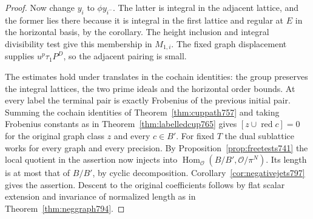 \documentclass[a4paper,11pt]{article}
\theoremstyle{definition}
\theoremstyle{remark}
\numberwithin{equation}{section}
\begin{document}
\begin{proof}
Now change \(y_i\) to \(\phi y_{i^-}\). The latter is
integral in the adjacent lattice, and the former lies
there because it is integral in the first lattice and
regular at \(E\) in the horizontal basis, by the
corollary. The height inclusion and integral divisibility
test give this membership in \(M_{1,i}\). The fixed graph
displacement supplies \(u^p\tau_1P^D\), so the adjacent
pairing is small.

The estimates hold under translates in the cochain identities:
the group preserves the integral lattices, the two prime
ideals and the horizontal order bounds. At every label
the terminal pair is exactly Frobenius of the previous
initial pair. Summing the cochain identities of
Theorem~\ref{thm:cuppath757} and taking Frobenius constants
as in Theorem~\ref{thm:labelledcup765} gives
\([z\cup\operatorname{red}c]=0\) for the original graph
class \(z\) and every \(c\in B'\). For fixed \(T\) the dual
sublattice works for every graph and every precision. By
Proposition~\ref{prop:freetests741} the local quotient in
the assertion now injects into
\(\operatorname{Hom}_{\mathcal O}(B/B',\mathcal O/\pi^N)\).
Its length is at most that of \(B/B'\), by cyclic
decomposition. Corollary~\ref{cor:negativejets797} gives
the assertion. Descent to the original coefficients follows
by flat scalar extension and invariance of normalized
length as in Theorem~\ref{thm:neggraph794}.
\end{proof}
\end{document}
